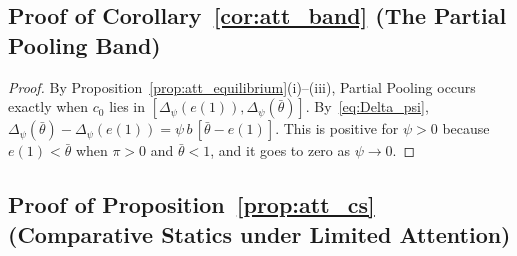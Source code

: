 \subsection*{Proof of Corollary~\ref{cor:att_band} (The Partial Pooling Band)}

\begin{proof}\upshape
By Proposition~\ref{prop:att_equilibrium}(i)--(iii), Partial Pooling occurs exactly when $c_0$ lies in $[\Delta_\psi(e(1)),\Delta_\psi(\bar\theta)]$. By~\eqref{eq:Delta_psi}, $\Delta_\psi(\bar\theta)-\Delta_\psi(e(1))=\psi\,b\,[\bar\theta-e(1)]$. This is positive for $\psi>0$ because $e(1)<\bar\theta$ when $\pi>0$ and $\bar\theta<1$, and it goes to zero as $\psi\to0$.
\end{proof}

\subsection*{Proof of Proposition~\ref{prop:att_cs} (Comparative Statics under Limited Attention)}

